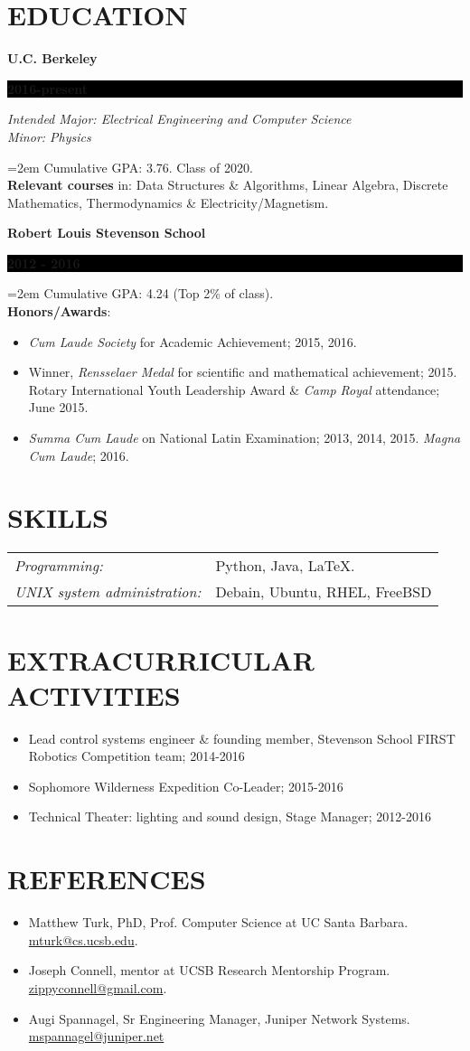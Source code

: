 \documentclass[paper=a4,fontsize=11pt]{scrartcl} %
\newcommand{\sepspace}{\vspace*{0.5em}}		%
\newcommand{\NewPart}[1]{\section*{\uppercase{#1}}}
\newcommand{\EducationEntry}[4]{
		\noindent \textbf{#1} \hfill      %
		\colorbox{Black}{%
			\parbox{6.5em}{%
			\hfill\color{White}\textbf{#2}}} \par  %
		\noindent \textit{#3} \par        %
		\noindent\hangindent=2em\hangafter=0 \small #4 %
		\normalsize \par}
\newcommand{\EducationEntryNoSubtitle}[3]{
	\noindent \textbf{#1} \hfill      %
	\colorbox{Black}{%
		\parbox{6em}{%
			\hfill\color{White}\textbf{#2}}} \par %
	\noindent\hangindent=2em\hangafter=0 \small #3 %
	\normalsize \par}
\begin{document}
\label{EDU}
\NewPart{Education}{}

\EducationEntry{U.C. Berkeley}{2016-present}{Intended Major: Electrical Engineering and Computer Science\\Minor: Physics}{Cumulative GPA: 3.76. Class of 2020.\\\textbf{Relevant courses} in: Data Structures \& Algorithms, Linear Algebra, Discrete Mathematics, Thermodynamics \& Electricity/Magnetism.}
\sepspace

\EducationEntryNoSubtitle{Robert Louis Stevenson School}{2012 - 2016}{Cumulative GPA: 4.24 (Top 2\% of class).\\\textbf{Honors/Awards}:\begin{itemize}\setlength\itemsep{0em}
		\item\textit{Cum Laude Society} for Academic Achievement; 2015, 2016.
		\item Winner, \textit{Rensselaer Medal} for scientific and mathematical achievement; 2015.
		\indent Rotary International Youth Leadership Award \& \textit{Camp Royal} attendance; June 2015.
		\item \textit{Summa Cum Laude} on National Latin Examination; 2013, 2014, 2015. \textit{Magna Cum Laude}; 2016.\end{itemize}
	}
	
	


\label{SKILLS}
\NewPart{Skills}{}
\begin{tabular}{ll}
\textit{Programming:} & Python, Java, \LaTeX.\\
\textit{UNIX system administration:} & Debain, Ubuntu, RHEL, FreeBSD\\
\end{tabular}

\label{EXTRACUR}
\NewPart{Extracurricular Activities}{}
\begin{itemize}\setlength\itemsep{-.5em}
	\item Lead control systems engineer \& founding member, Stevenson School FIRST Robotics Competition team; 2014-2016
	\item Sophomore Wilderness Expedition Co-Leader; 2015-2016
	\item Technical Theater: lighting and sound design, Stage Manager; 2012-2016
\end{itemize}

\label{REFERENCES}
\NewPart{References}{}
\begin{itemize}\setlength\itemsep{-.5em}
	\item Matthew Turk, PhD, Prof. Computer Science at UC Santa Barbara. \url{mturk@cs.ucsb.edu}.
	\item Joseph Connell, mentor at UCSB Research Mentorship Program. \url{zippyconnell@gmail.com}.
	\item Augi Spannagel, Sr Engineering Manager, Juniper Network Systems. \url{mspannagel@juniper.net}
\end{itemize}
\end{document}
